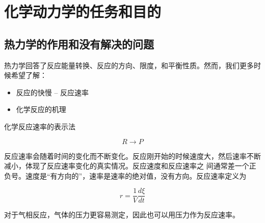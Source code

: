 \section{化学动力学的任务和目的}

\subsection{热力学的作用和没有解决的问题}

热力学回答了反应能量转换、反应的方向、限度，和平衡性质。然而，我们更多时候希望了解：

\begin{itemize}
    \item 反应的快慢 -- 反应速率
    \item 化学反应的机理
\end{itemize}

化学反应速率的表示法

\[
    R \rightarrow P
\]

反应速率会随着时间的变化而不断变化。反应刚开始的时候速度大，然后速率不断减小，体现了反应速率变化的真实情况。反应速度和反应速率之 间通常差一个正负号。速度是``有方向的''，速率是速率的绝对值，没有方向。反应速率定义为

\[
    r = \frac{1}{V} \frac{d \xi}{dt}
\]

对于气相反应，气体的压力更容易测定，因此也可以用压力作为反应速率。
